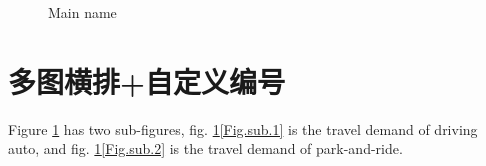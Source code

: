 \documentclass{article}
\begin{document}
\begin{figure}[H]
\centering  %
\caption{Main name}
\label{Fig.main}
\end{figure}


\section{多图横排+自定义编号}

Figure \ref{Fig.main} has two sub-figures, 
fig. \ref{Fig.main}\ref{Fig.sub.1} is the travel demand of driving auto, 
and fig. \ref{Fig.main}\ref{Fig.sub.2} is the travel demand of park-and-ride.
\end{document}
